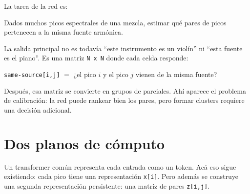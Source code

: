 \documentclass[11pt]{article}
\begin{document}
La tarea de la red es:

\begin{goldbox}
Dados muchos picos espectrales de una mezcla, estimar qué pares de picos pertenecen a la misma fuente armónica.
\end{goldbox}

\smallskip
La salida principal no es todavía ``este instrumento es un violín'' ni ``esta fuente es el piano''. Es una matriz \texttt{N x N} donde cada celda responde:

\begin{quietbox}
\texttt{same-source[i,j]} $=$ ¿el pico $i$ y el pico $j$ vienen de la misma fuente?
\end{quietbox}

\smallskip
Después, esa matriz se convierte en grupos de parciales. Ahí aparece el problema de calibración: la red puede rankear bien los pares, pero formar clusters requiere una decisión adicional.

\section{Dos planos de cómputo}

Un transformer común representa cada entrada como un token. Acá eso sigue existiendo: cada pico tiene una representación \texttt{x[i]}. Pero además se construye una segunda representación persistente: una matriz de pares \texttt{z[i,j]}.
\end{document}
